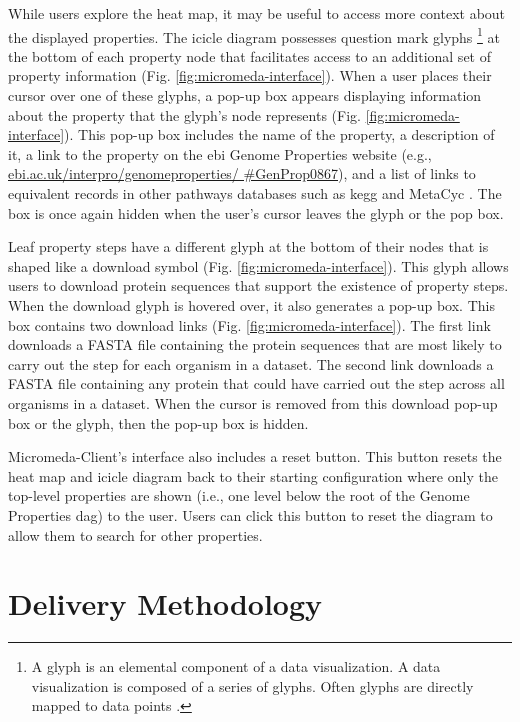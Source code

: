 While users explore the heat map, it may be useful to access more context about the displayed properties. The icicle diagram possesses question mark glyphs \footnote{A glyph is an elemental component of a data visualization. A data visualization is composed of a series of glyphs. Often glyphs are directly mapped to data points \cite{chen}.} at the bottom of each property node that facilitates access to an additional set of property information (Fig. \ref{fig:micromeda-interface}). When a user places their cursor over one of these glyphs, a pop-up box appears displaying information about the property that the glyph's node represents (Fig. \ref{fig:micromeda-interface}). This pop-up box includes the name of the property, a description of it, a link to the property on the \gls{ebi}  Genome Properties website (e.g., \href{https://www.ebi.ac.uk/interpro/genomeproperties/#GenProp0867}{ebi.ac.uk/interpro/genomeproperties/ \#GenProp0867}), and a list of links to equivalent records in other pathways databases such as \gls{kegg} \cite{kanehisa2000kegg} and MetaCyc \cite{karp2002metacyc}. The box is once again hidden when the user's cursor leaves the glyph or the pop box.

Leaf property steps have a different glyph at the bottom of their nodes that is shaped like a download symbol (Fig. \ref{fig:micromeda-interface}). This glyph allows users to download protein sequences that support the existence of property steps. When the download glyph is hovered over, it also generates a pop-up box. This box contains two download links (Fig. \ref{fig:micromeda-interface}). The first link downloads a FASTA file containing the protein sequences that are most likely to carry out the step for each organism in a dataset. The second link downloads a FASTA file containing any protein that could have carried out the step across all organisms in a dataset. When the cursor is removed from this download pop-up box or the glyph, then the pop-up box is hidden.

Micromeda-Client's interface also includes a reset button. This button resets the heat map and icicle diagram back to their starting configuration where only the top-level properties are shown (i.e., one level below the root of the Genome Properties \gls{dag}) to the user. Users can click this button to reset the diagram to allow them to search for other properties.

\section{Delivery Methodology} \label{client-delivery-method}

